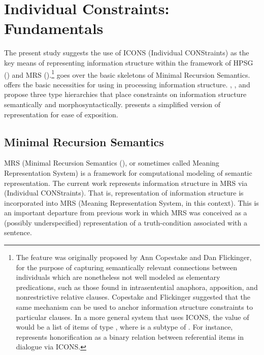 \chapter{Individual Constraints: Fundamentals}
\label{chapter9}
\setcounter{enums}{0}


\noindent The present study suggests the use of ICONS (Individual
CONStraints) as the key means of representing information structure
within the framework of HPSG (\citealt{pollard:sag:94}) and
MRS
(\citealt{copestake:etal:05}).\footnote{The feature  was
  originally proposed by Ann Copestake and Dan
  Flickinger, for the purpose
  of capturing semantically relevant connections between individuals
  which are nonetheless not well modeled as elementary predications,
  such as those found in intrasentential anaphora, apposition, and
  nonrestrictive relative clauses. Copestake and
  Flickinger suggested that the same mechanism can be used to anchor
  information structure constraints to particular clauses.  In a more
  general system that uses ICONS, the value of  would be a
  list of items of type , where  is a subtype
  of . For instance, \citet{song:16}
  represents honorification as a binary relation between referential
  items in dialogue via ICONS.}  goes over the basic
skeletons of Minimal Recursion Semantics.  
offers the basic necessities for using  in processing
information structure. , , and
 propose three type hierarchies that place
constraints on information structure semantically and
morphosyntactically.   presents a simplified version
of representation for ease of exposition.




\section{Minimal Recursion Semantics}
\label{2:sec:mrs}


MRS (Minimal Recursion Semantics
(\citealt{copestake:etal:05}), or sometimes called Meaning
Representation System) is a framework for computational modeling of
semantic representation.  The current work represents information
structure in MRS via  (Individual
CONStraints). That is, representation of
information structure is incorporated into MRS (Meaning Representation
System, in this context).  This is an important departure from
previous work in which MRS was conceived as a (possibly
underspecified) representation of a truth-condition associated with a
sentence.



